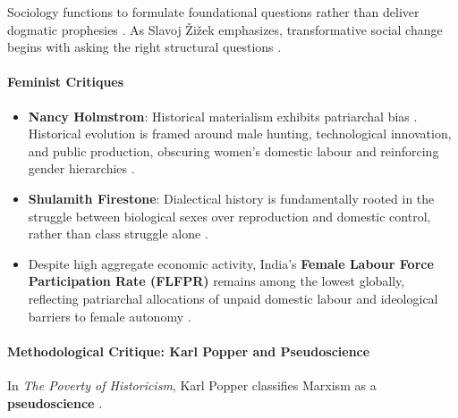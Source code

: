 \begin{KeyConcept}
Sociology functions to formulate foundational questions rather than deliver dogmatic prophesies . As Slavoj \v{Z}i\v{z}ek emphasizes, transformative social change begins with asking the right structural questions .
\end{KeyConcept}

\paragraph{Feminist Critiques}
\begin{itemize}
    \item \textbf{Nancy Holmstrom}: Historical materialism exhibits patriarchal bias . Historical evolution is framed around male hunting, technological innovation, and public production, obscuring women's domestic labour and reinforcing gender hierarchies .
    \item \textbf{Shulamith Firestone}: Dialectical history is fundamentally rooted in the struggle between biological sexes over reproduction and domestic control, rather than class struggle alone .
\end{itemize}

\begin{DataFact}
\begin{itemize}
    \item Despite high aggregate economic activity, India's \textbf{Female Labour Force Participation Rate (FLFPR)} remains among the lowest globally, reflecting patriarchal allocations of unpaid domestic labour and ideological barriers to female autonomy .
\end{itemize}
\end{DataFact}

\paragraph{Methodological Critique: Karl Popper and Pseudoscience}
In \textit{The Poverty of Historicism}, Karl Popper classifies Marxism as a \textbf{pseudoscience} .

